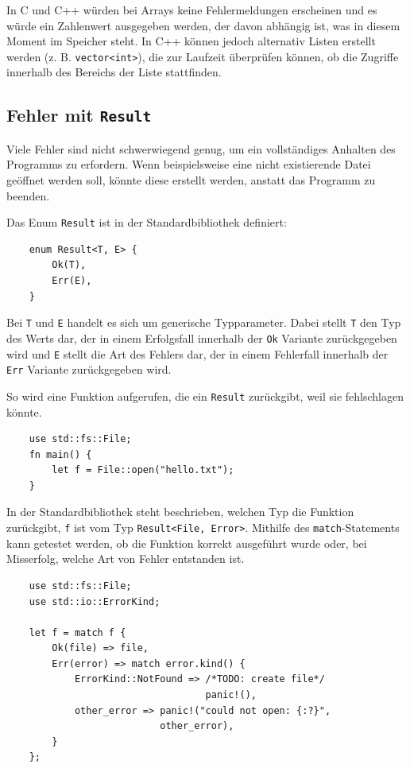 In C und C++ würden bei Arrays keine Fehlermeldungen erscheinen und es würde ein Zahlenwert ausgegeben werden, der davon abhängig ist, was in diesem Moment im Speicher steht. In C++ können jedoch alternativ Listen erstellt werden (z. B. \verb"vector<int>"), die zur Laufzeit überprüfen können, ob die Zugriffe innerhalb des Bereichs der Liste stattfinden.

\subsection{Fehler mit \texttt{Result}}

Viele Fehler sind nicht schwerwiegend genug, um ein vollständiges Anhalten des Programms zu erfordern. Wenn beispielsweise eine nicht existierende Datei geöffnet werden soll, könnte diese erstellt werden, anstatt das Programm zu beenden.

Das Enum \verb"Result" ist in der Standardbibliothek definiert:

\begin{lstlisting}
    enum Result<T, E> {
        Ok(T),
        Err(E),
    }
\end{lstlisting}

Bei \verb"T" und \verb"E" handelt es sich um generische Typparameter. Dabei stellt \verb"T" den Typ des Werts dar, der in einem Erfolgsfall innerhalb der \verb"Ok" Variante zurückgegeben wird und \verb"E" stellt die Art des Fehlers dar, der in einem Fehlerfall innerhalb der \verb"Err" Variante zurückgegeben wird.

So wird eine Funktion aufgerufen, die ein \verb"Result" zurückgibt, weil sie fehlschlagen könnte.

\begin{lstlisting}
    use std::fs::File;
    fn main() {
        let f = File::open("hello.txt");
    }
\end{lstlisting}

In der Standardbibliothek steht beschrieben, welchen Typ die Funktion zu\-rück\-gibt, \verb"f" ist vom Typ \verb"Result<File, Error>". Mithilfe des \verb"match"-Statements kann getestet werden, ob die Funktion korrekt ausgeführt wurde oder, bei Misserfolg, welche Art von Fehler entstanden ist.

\begin{lstlisting}
    use std::fs::File;
    use std::io::ErrorKind;

    let f = match f {
        Ok(file) => file,
        Err(error) => match error.kind() {
            ErrorKind::NotFound => /*TODO: create file*/
                                   panic!(),
            other_error => panic!("could not open: {:?}",
                           other_error),
        }
    };
\end{lstlisting}

